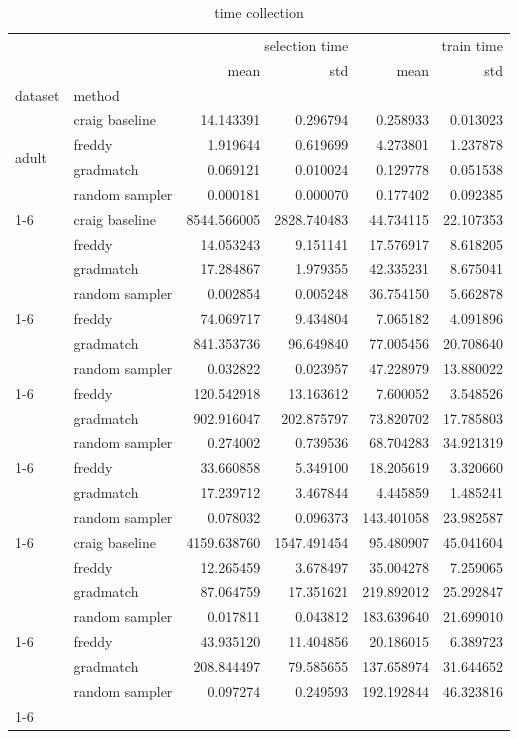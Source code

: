\begin{table}\label{tab:time}
\caption{time collection}
\centering
\begin{tabular}{llrrrr}
\toprule
 &  & \multicolumn{2}{r}{selection time} & \multicolumn{2}{r}{train time} \\
 &  & mean & std & mean & std \\
dataset & method &  &  &  &  \\
\midrule
\multirow[t]{4}{*}{adult} & craig baseline & 14.143391 & 0.296794 & 0.258933 & 0.013023 \\
 & freddy & 1.919644 & 0.619699 & 4.273801 & 1.237878 \\
 & gradmatch & 0.069121 & 0.010024 & 0.129778 & 0.051538 \\
 & random sampler & 0.000181 & 0.000070 & 0.177402 & 0.092385 \\
\cline{1-6}
\multirow[t]{4}{*}{covtype} & craig baseline & 8544.566005 & 2828.740483 & 44.734115 & 22.107353 \\
 & freddy & 14.053243 & 9.151141 & 17.576917 & 8.618205 \\
 & gradmatch & 17.284867 & 1.979355 & 42.335231 & 8.675041 \\
 & random sampler & 0.002854 & 0.005248 & 36.754150 & 5.662878 \\
\cline{1-6}
\multirow[t]{3}{*}{hepmass} & freddy & 74.069717 & 9.434804 & 7.065182 & 4.091896 \\
 & gradmatch & 841.353736 & 96.649840 & 77.005456 & 20.708640 \\
 & random sampler & 0.032822 & 0.023957 & 47.228979 & 13.880022 \\
\cline{1-6}
\multirow[t]{3}{*}{higgs} & freddy & 120.542918 & 13.163612 & 7.600052 & 3.548526 \\
 & gradmatch & 902.916047 & 202.875797 & 73.820702 & 17.785803 \\
 & random sampler & 0.274002 & 0.739536 & 68.704283 & 34.921319 \\
\cline{1-6}
\multirow[t]{3}{*}{predictmds} & freddy & 33.660858 & 5.349100 & 18.205619 & 3.320660 \\
 & gradmatch & 17.239712 & 3.467844 & 4.445859 & 1.485241 \\
 & random sampler & 0.078032 & 0.096373 & 143.401058 & 23.982587 \\
\cline{1-6}
\multirow[t]{4}{*}{sgemm} & craig baseline & 4159.638760 & 1547.491454 & 95.480907 & 45.041604 \\
 & freddy & 12.265459 & 3.678497 & 35.004278 & 7.259065 \\
 & gradmatch & 87.064759 & 17.351621 & 219.892012 & 25.292847 \\
 & random sampler & 0.017811 & 0.043812 & 183.639640 & 21.699010 \\
\cline{1-6}
\multirow[t]{3}{*}{storage perf} & freddy & 43.935120 & 11.404856 & 20.186015 & 6.389723 \\
 & gradmatch & 208.844497 & 79.585655 & 137.658974 & 31.644652 \\
 & random sampler & 0.097274 & 0.249593 & 192.192844 & 46.323816 \\
\cline{1-6}
\bottomrule
\end{tabular}
\end{table}
